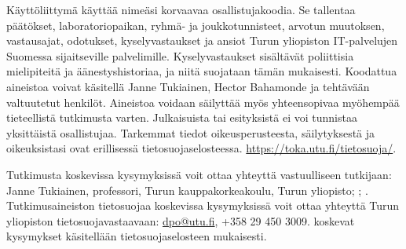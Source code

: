 
Käyttöliittymä käyttää nimeäsi korvaavaa osallistujakoodia. Se tallentaa päätökset, laboratoriopaikan, ryhmä- ja joukkotunnisteet, arvotun muutoksen, vastausajat, odotukset, kyselyvastaukset ja ansiot Turun yliopiston IT-palvelujen Suomessa sijaitseville palvelimille. Kyselyvastaukset sisältävät poliittisia mielipiteitä ja äänestyshistoriaa, ja niitä suojataan tämän mukaisesti.  Koodattua aineistoa voivat käsitellä Janne Tukiainen, Hector Bahamonde ja tehtävään valtuutetut henkilöt. Aineistoa voidaan säilyttää myös yhteensopivaa myöhempää tieteellistä tutkimusta varten. Julkaisuista tai esityksistä ei voi tunnistaa yksittäistä osallistujaa. Tarkemmat tiedot oikeusperusteesta, säilytyksestä ja oikeuksistasi ovat erillisessä tietosuojaselosteessa. \url{https://toka.utu.fi/tietosuoja/}.

Tutkimusta koskevissa kysymyksissä voit ottaa yhteyttä vastuulliseen tutkijaan: Janne Tukiainen, professori, Turun kauppakorkeakoulu, Turun yliopisto; \StudyEmail; \StudyPhone. Tutkimusaineiston tietosuojaa koskevissa kysymyksissä voit ottaa yhteyttä Turun yliopiston tietosuojavastaavaan: \href{mailto:dpo@utu.fi}{dpo@utu.fi}, +358 29 450 3009.  koskevat kysymykset käsitellään  tietosuojaselosteen mukaisesti.


